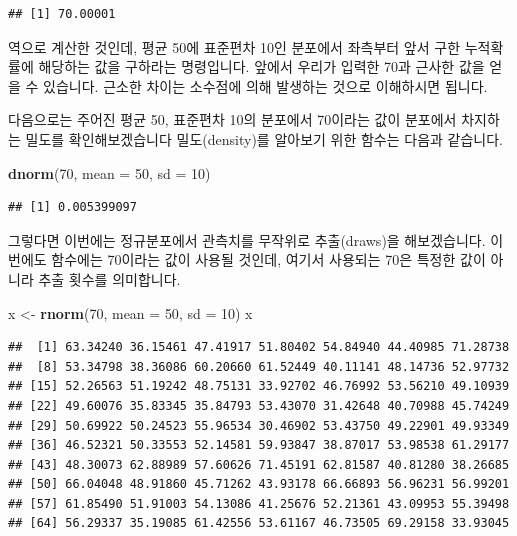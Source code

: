 \documentclass[]{book}
\newenvironment{Shaded}{\begin{snugshade}}{\end{snugshade}}
\newcommand{\DataTypeTok}[1]{\textcolor[rgb]{0.13,0.29,0.53}{#1}}
\newcommand{\DecValTok}[1]{\textcolor[rgb]{0.00,0.00,0.81}{#1}}
\newcommand{\KeywordTok}[1]{\textcolor[rgb]{0.13,0.29,0.53}{\textbf{#1}}}
\newcommand{\NormalTok}[1]{#1}
\newcommand{\StringTok}[1]{\textcolor[rgb]{0.31,0.60,0.02}{#1}}
\begin{document}
\begin{verbatim}
## [1] 70.00001
\end{verbatim}

역으로 계산한 것인데, 평균 50에 표준편차 10인 분포에서 좌측부터 앞서 구한 누적확률에 해당하는 값을 구하라는 명령입니다. 앞에서 우리가 입력한 70과 근사한 값을 얻을 수 있습니다. 근소한 차이는 소수점에 의해 발생하는 것으로 이해하시면 됩니다.

다음으로는 주어진 평균 50, 표준편차 10의 분포에서 70이라는 값이 분포에서 차지하는 밀도를 확인해보겠습니다 밀도(density)를 알아보기 위한 함수는 다음과 같습니다.

\begin{Shaded}
\begin{Highlighting}[]
\KeywordTok{dnorm}\NormalTok{(}\DecValTok{70}\NormalTok{, }\DataTypeTok{mean =} \DecValTok{50}\NormalTok{, }\DataTypeTok{sd =} \DecValTok{10}\NormalTok{)}
\end{Highlighting}
\end{Shaded}

\begin{verbatim}
## [1] 0.005399097
\end{verbatim}

그렇다면 이번에는 정규분포에서 관측치를 무작위로 추출(draws)을 해보겠습니다. 이번에도 함수에는 70이라는 값이 사용될 것인데, 여기서 사용되는 70은 특정한 값이 아니라 추출 횟수를 의미합니다.

\begin{Shaded}
\begin{Highlighting}[]
\NormalTok{x <-}\StringTok{ }\KeywordTok{rnorm}\NormalTok{(}\DecValTok{70}\NormalTok{, }\DataTypeTok{mean =} \DecValTok{50}\NormalTok{, }\DataTypeTok{sd =} \DecValTok{10}\NormalTok{)}
\NormalTok{x}
\end{Highlighting}
\end{Shaded}

\begin{verbatim}
##  [1] 63.34240 36.15461 47.41917 51.80402 54.84940 44.40985 71.28738
##  [8] 53.34798 38.36086 60.20660 61.52449 40.11141 48.14736 52.97732
## [15] 52.26563 51.19242 48.75131 33.92702 46.76992 53.56210 49.10939
## [22] 49.60076 35.83345 35.84793 53.43070 31.42648 40.70988 45.74249
## [29] 50.69922 50.24523 55.96534 30.46902 53.43750 49.22901 49.93349
## [36] 46.52321 50.33553 52.14581 59.93847 38.87017 53.98538 61.29177
## [43] 48.30073 62.88989 57.60626 71.45191 62.81587 40.81280 38.26685
## [50] 66.04048 48.91860 45.71262 43.93178 66.66893 56.96231 56.99201
## [57] 61.85490 51.91003 54.13086 41.25676 52.21361 43.09953 55.39498
## [64] 56.29337 35.19085 61.42556 53.61167 46.73505 69.29158 33.93045
\end{verbatim}
\end{document}
